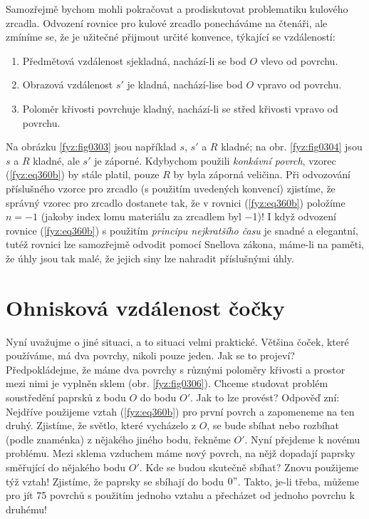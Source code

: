     Samozřejmě bychom mohli pokračovat a prodiskutovat problematiku kulového zrcadla. Odvození 
    rovnice pro kulové zrcadlo ponecháváme na čtenáři, ale zmíníme se, že je užitečné přijmout 
    určité konvence, týkající se vzdáleností: 
    \begin{enumerate}[noitemsep]
      \item Předmětová vzdálenost sjekladná, nachází-li se bod \(O\) vlevo od povrchu.
      \item Obrazová vzdálenost \(s'\) je kladná, nachází-lise bod \(O\) vpravo od povrchu.
      \item Poloměr křivosti povrchuje kladný, nachází-li se střed křivosti vpravo od povrchu.
    \end{enumerate}

    Na obrázku \ref{fyz:fig0303} jsou například \(s\), \(s'\) a \(R\) kladné; na obr. 
    \ref{fyz:fig0304} jsou \(s\) a \(R\) kladné, ale \(s'\) je záporné. Kdybychom použili 
    \emph{konkávní povrch}, vzorec (\ref{fyz:eq360b}) by stále platil, pouze \(R\) by byla záporná 
    veličina. Při odvozování příslušného vzorce pro zrcadlo (s použitím uvedených konvencí) 
    zjistíme, že správný vzorec pro zrcadlo dostanete tak, že v rovnici (\ref{fyz:eq360b}) položíme 
    \(n = -1\) (jakoby index lomu materiálu za zrcadlem byl \num{-1})! I když odvození 
    rovnice (\ref{fyz:eq360b}) s použitím \emph{principu nejkratšího času} je snadné a elegantní, 
    tutéž rovnici lze samozřejmě odvodit pomocí Snellova zákona, máme-li na paměti, že úhly jsou 
    tak malé, že jejich siny lze nahradit příslušnými úhly.
    
    
  \section{Ohnisková vzdálenost čočky}\label{fyz:IchapXXVIIsecIII}
    Nyní uvažujme o jiné situaci, a to situaci velmi praktické. Většina čoček, které používáme, má 
    dva povrchy, nikoli pouze jeden. Jak se to projeví? Předpokládejme, že máme dva povrchy s 
    různými poloměry křivosti a prostor mezi nimi je vyplněn sklem (obr. \ref{fyz:fig0306}). Chceme 
    studovat problém soustředění paprsků z bodu \(O\) do bodu \(O'\). Jak to lze provést? Odpověď 
    zní: Nejdříve použijeme vztah (\ref{fyz:eq360b}) pro první povrch a zapomeneme na ten druhý. 
    Zjistíme, že světlo, které vycházelo z \(O\), se bude sbíhat nebo rozbíhat (podle znaménka) z 
    nějakého jiného bodu, řekněme \(O'\). Nyní přejdeme k novému problému. Mezi sklema vzduchem  
    máme nový povrch, na nějž dopadají paprsky směřující do nějakého bodu \(O'\). Kde se budou 
    skutečně sbíhat? Znovu použijeme týž vztah! Zjistíme, že paprsky se sbíhají do bodu \(0"\). 
    Takto, je-li třeba, můžeme pro jít \num{75} povrchů s použitím jednoho vztahu a přecházet od 
    jednoho povrchu k druhému!
   
